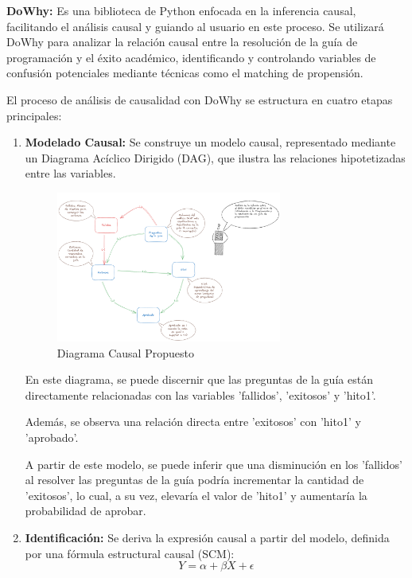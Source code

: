 \textbf{DoWhy:} Es una biblioteca de Python enfocada en la inferencia causal, facilitando el análisis causal y guiando al usuario en este proceso. Se utilizará DoWhy para analizar la relación causal entre la resolución de la guía de programación y el éxito académico, identificando y controlando variables de confusión potenciales mediante técnicas como el matching de propensión.

El proceso de análisis de causalidad con DoWhy se estructura en cuatro etapas principales:

\begin{enumerate}
    \item \textbf{Modelado Causal:} Se construye un modelo causal, representado mediante un Diagrama Acíclico Dirigido (DAG), que ilustra las relaciones hipotetizadas entre las variables. 

    \begin{figure}[H]
      \centering
      \includegraphics[width=0.7\textwidth]{img/causalidad/diagrama_causal_tesis.png}
      \caption{Diagrama Causal Propuesto}
      \label{fig:diagrama_causal_propuesto}
    \end{figure}

    En este diagrama, se puede discernir que las preguntas de la guía están directamente relacionadas con las variables 'fallidos', 'exitosos' y 'hito1'.

    Además, se observa una relación directa entre 'exitosos' con 'hito1' y 'aprobado'.

    A partir de este modelo, se puede inferir que una disminución en los 'fallidos' al resolver las preguntas de la guía podría incrementar la cantidad de 'exitosos', lo cual, a su vez, elevaría el valor de 'hito1' y aumentaría la probabilidad de aprobar.

    \item \textbf{Identificación:} Se deriva la expresión causal a partir del modelo, definida por una fórmula estructural causal (SCM):
    \begin{equation}
        Y = \alpha + \beta X + \epsilon
    \end{equation}


\end{enumerate}
